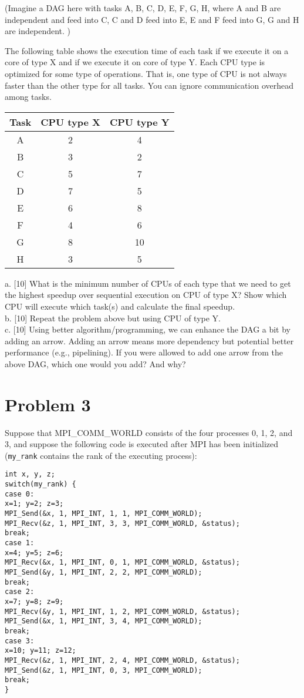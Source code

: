\documentclass{article}
\begin{document}
(Imagine a DAG here with tasks A, B, C, D, E, F, G, H, where A and B are independent and feed into C, C and D feed into E, E and F feed into G, G and H are independent. )

The following table shows the execution time of each task if we execute it on a core of type X and if we execute it on core of type Y. Each CPU type is optimized for some type of operations. That is, one type of CPU is not always faster than the other type for all tasks. You can ignore communication overhead among tasks.

\begin{tabular}{|c|c|c|}
\hline
Task & CPU type X & CPU type Y \\ \hline
A & 2 & 4 \\ \hline
B & 3 & 2 \\ \hline
C & 5 & 7 \\ \hline
D & 7 & 5 \\ \hline
E & 6 & 8 \\ \hline
F & 4 & 6 \\ \hline
G & 8 & 10 \\ \hline
H & 3 & 5 \\ \hline
\end{tabular}

a. [10] What is the minimum number of CPUs of each type that we need to get the highest speedup over sequential execution on CPU of type X? Show which CPU will execute which task(s) and calculate the final speedup. \\
b. [10] Repeat the problem above but using CPU of type Y. \\
c. [10] Using better algorithm/programming, we can enhance the DAG a bit by adding an arrow. Adding an arrow means more dependency but potential better performance (e.g., pipelining). If you were allowed to add one arrow from the above DAG, which one would you add? And why?

\section*{Problem 3}
Suppose that MPI\_COMM\_WORLD consists of the four processes 0, 1, 2, and 3, and suppose the following code is executed after MPI has been initialized (\texttt{my\_rank} contains the rank of the executing process):

\begin{verbatim}
int x, y, z;
switch(my_rank) {
case 0:
x=1; y=2; z=3;
MPI_Send(&x, 1, MPI_INT, 1, 1, MPI_COMM_WORLD);
MPI_Recv(&z, 1, MPI_INT, 3, 3, MPI_COMM_WORLD, &status);
break;
case 1:
x=4; y=5; z=6;
MPI_Recv(&x, 1, MPI_INT, 0, 1, MPI_COMM_WORLD, &status);
MPI_Send(&y, 1, MPI_INT, 2, 2, MPI_COMM_WORLD);
break;
case 2:
x=7; y=8; z=9;
MPI_Recv(&y, 1, MPI_INT, 1, 2, MPI_COMM_WORLD, &status);
MPI_Send(&x, 1, MPI_INT, 3, 4, MPI_COMM_WORLD);
break;
case 3:
x=10; y=11; z=12;
MPI_Recv(&z, 1, MPI_INT, 2, 4, MPI_COMM_WORLD, &status);
MPI_Send(&z, 1, MPI_INT, 0, 3, MPI_COMM_WORLD);
break;
}
\end{verbatim}
\end{document}
